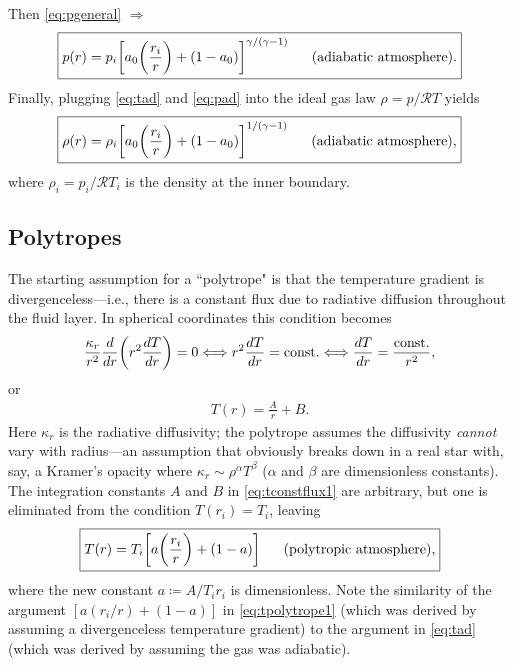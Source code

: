 \documentclass[12pt]{article} %
\newcommand{\bigfrac}[2]{\bigg{(}\frac{#1}{#2}\bigg{)}}
\begin{document}
	Then \eqref{eq:pgeneral} $\Longrightarrow$
	\begin{align}
	\boxed{
	p(r) = p_i \bigg{[}a_0\bigfrac{r_i}{r} + (1-a_0)\bigg{]}^{\gamma/(\gamma-1)} \ \ \ \ \ \text{(adiabatic atmosphere).}
}
\label{eq:pad}
	\end{align}
	Finally, plugging \eqref{eq:tad} and \eqref{eq:pad} into the ideal gas law $\rho=p/\mathcal{R} T$ yields
	\begin{align}
\boxed{
	\rho(r) = \rho_i \bigg{[}a_0\bigfrac{r_i}{r} + (1-a_0)\bigg{]}^{1/(\gamma-1)} \ \ \ \ \ \text{(adiabatic atmosphere),}
}
\label{eq:rhoad}
\end{align}
where $\rho_i = p_i/\mathcal{R}T_i$ is the density at the inner boundary.

\subsection{Polytropes}
The starting assumption for a ``polytrope" is that the temperature gradient is divergenceless---i.e., there is a constant flux due to radiative diffusion throughout the fluid layer. In 
spherical coordinates this condition becomes
\begin{align*}
\frac{\kappa_r}{r^2}\frac{d}{dr}\bigg{(}r^2\frac{dT}{dr}\bigg{)} = 0 \Longleftrightarrow r^2\frac{dT}{dr}=\text{const.} \Longleftrightarrow \frac{dT}{dr} = \frac{\text{const.}}{r^2},
\end{align*}
or
\begin{align}
T(r) = \frac{A}{r} + B.
\label{eq:tconstflux1}
\end{align}
Here $\kappa_r$ is the radiative diffusivity; the polytrope assumes the diffusivity \textit{cannot} vary with radius---an assumption that obviously breaks down in a real star with, say, a Kramer's opacity where $\kappa_r\sim \rho^\alpha T^\beta$ ($\alpha$ and $\beta$ are dimensionless constants). The integration constants $A$ and $B$ in \eqref{eq:tconstflux1} are arbitrary, but one is eliminated from the condition $T(r_i) = T_i$, leaving
\begin{align}
\boxed{
T(r) = T_i \bigg{[}a\bigg{(}\frac{r_i}{r}\bigg{)} + (1 - a)\bigg{]} \ \ \ \ \ \text{(polytropic atmosphere)},
}
\label{eq:tpolytrope1}
\end{align}
where the new constant $a\coloneqq A/T_ir_i$ is dimensionless. Note the similarity of the argument $[a(r_i/r) + (1-a)]$ in \eqref{eq:tpolytrope1} (which was derived by assuming a divergenceless temperature gradient) to the argument in \eqref{eq:tad} (which was derived by assuming the gas was adiabatic). 
\end{document}
